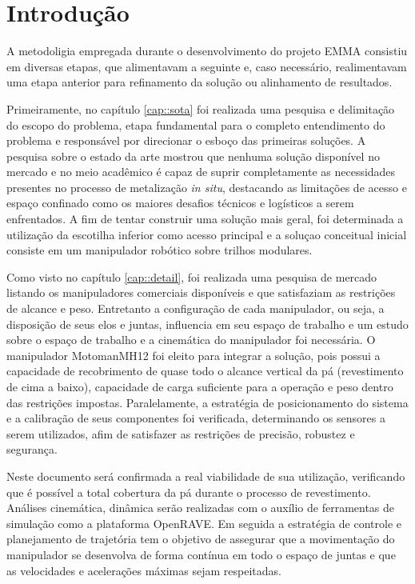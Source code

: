 \section{Introdução}

A metodoligia empregada durante o desenvolvimento do projeto EMMA consistiu em
diversas etapas, que alimentavam a seguinte e, caso necessário,
realimentavam uma etapa anterior para refinamento da solução ou alinhamento de
resultados. 

Primeiramente, no capítulo \ref{cap::sota} foi realizada uma pesquisa e
delimitação do escopo do problema, etapa fundamental para o completo entendimento do
problema e responsável por direcionar o esboço das primeiras soluções. A
pesquisa sobre o estado da arte mostrou que nenhuma solução disponível no
mercado e no meio acadêmico é capaz de suprir completamente as necessidades
presentes no processo de metalização \textit{in situ}, destacando as limitações
de acesso e espaço confinado como os maiores desafios técnicos e logísticos a
serem enfrentados. A fim de tentar construir uma solução mais geral, foi
determinada a utilização da escotilha inferior como acesso principal e a soluçao
conceitual inicial consiste em um manipulador robótico sobre trilhos modulares.

Como visto no capítulo \ref{cap::detail},  foi realizada uma pesquisa de
mercado listando os manipuladores comerciais disponíveis e que satisfaziam as restrições de alcance
e peso. Entretanto a configuração de cada manipulador, ou seja, a disposição
de seus elos e juntas, influencia em seu espaço de trabalho e um estudo sobre o
espaço de trabalho e a cinemática do manipulador foi necessária. O
manipulador Motoman\textregistered MH12 foi eleito para integrar a solução, pois
possui a capacidade de recobrimento de quase todo o alcance vertical da pá
(revestimento de cima a baixo), capacidade de carga suficiente para a operação e peso dentro das
restrições impostas. Paralelamente, a estratégia de posicionamento do sistema e
a calibração de seus componentes foi verificada, determinando os sensores a
serem utilizados, afim de satisfazer as restrições de precisão, robustez e
segurança.

Neste documento será confirmada a real viabilidade de
sua utilização, verificando que é possível a total cobertura da pá durante o
processo de revestimento. Análises cinemática, dinâmica serão realizadas com
o auxílio de ferramentas de simulação como a plataforma OpenRAVE. Em seguida a
estratégia de controle e planejamento de trajetória tem o objetivo de assegurar
que a movimentação do manipulador se desenvolva de forma contínua em todo o
espaço de juntas e que as velocidades e acelerações máximas sejam respeitadas.

